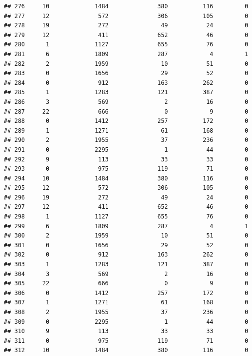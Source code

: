 \documentclass[
]{article}
\begin{document}
\begin{verbatim}
## 276     10             1484              380          116         0
## 277     12              572              306          105         0
## 278     19              272               49           24         0
## 279     12              411              652           46         0
## 280      1             1127              655           76         0
## 281      6             1809              287            4         1
## 282      2             1959               10           51         0
## 283      0             1656               29           52         0
## 284      0              912              163          262         0
## 285      1             1283              121          387         0
## 286      3              569                2           16         0
## 287     22              666                0            9         0
## 288      0             1412              257          172         0
## 289      1             1271               61          168         0
## 290      2             1955               37          236         0
## 291      0             2295                1           44         0
## 292      9              113               33           33         0
## 293      0              975              119           71         0
## 294     10             1484              380          116         0
## 295     12              572              306          105         0
## 296     19              272               49           24         0
## 297     12              411              652           46         0
## 298      1             1127              655           76         0
## 299      6             1809              287            4         1
## 300      2             1959               10           51         0
## 301      0             1656               29           52         0
## 302      0              912              163          262         0
## 303      1             1283              121          387         0
## 304      3              569                2           16         0
## 305     22              666                0            9         0
## 306      0             1412              257          172         0
## 307      1             1271               61          168         0
## 308      2             1955               37          236         0
## 309      0             2295                1           44         0
## 310      9              113               33           33         0
## 311      0              975              119           71         0
## 312     10             1484              380          116         0

\end{verbatim}
\end{document}
